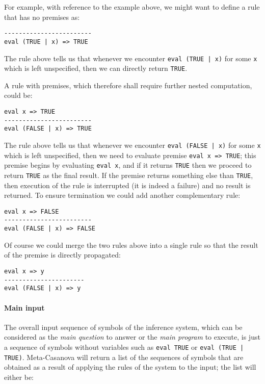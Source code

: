 For example, with reference to the example above, we might want to define a rule that has no premises as:

\begin{lstlisting}
------------------------
eval (TRUE | x) => TRUE
\end{lstlisting}

The rule above tells us that whenever we encounter \texttt{eval (TRUE | x)} for some \texttt{x} which is left unspecified, then we can directly return \texttt{TRUE}.

A rule with premises, which therefore shall require further nested computation, could be:

\begin{lstlisting}
eval x => TRUE
------------------------
eval (FALSE | x) => TRUE
\end{lstlisting}

The rule above tells us that whenever we encounter \texttt{eval (FALSE | x)} for some \texttt{x} which is left unspecified, then we need to evaluate premise \texttt{eval x => TRUE}; this premise begins by evaluating \texttt{eval x}, and if it returns \texttt{TRUE} then we proceed to return \texttt{TRUE} as the final result. If the premise returns something else than \texttt{TRUE}, then execution of the rule is interrupted (it is indeed a failure) and no result is returned. To ensure termination we could add another complementary rule:

\begin{lstlisting}
eval x => FALSE
------------------------
eval (FALSE | x) => FALSE
\end{lstlisting}

Of course we could merge the two rules above into a single rule so that the result of the premise is directly propagated:

\begin{lstlisting}
eval x => y
----------------------
eval (FALSE | x) => y
\end{lstlisting}


\paragraph{Main input}
The overall input sequence of symbols of the inference system, which can be considered as the \textit{main question} to answer or the \textit{main program} to execute, is just a sequence of symbols without variables such as \texttt{eval TRUE} or \texttt{eval (TRUE | TRUE)}. Meta-Casanova will return a list of the sequences of symbols that are obtained as a result of applying the rules of the system to the input; the list will either be:

